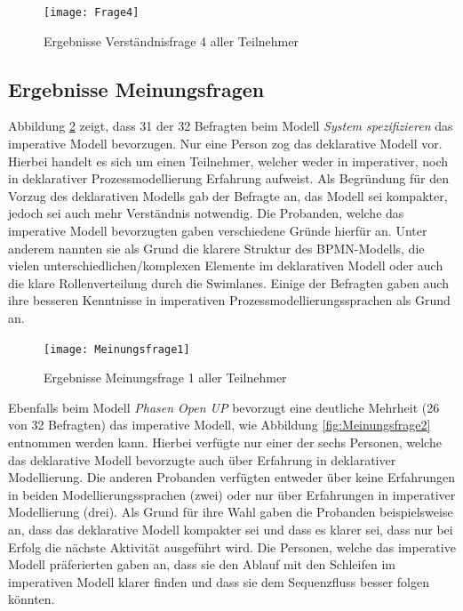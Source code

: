 \begin{figure}[htp]
\begin{center}
  \texttt{[image: Frage4]} %
  \caption{Ergebnisse Verständnisfrage 4 aller Teilnehmer}
  \label{fig:Frage4}
\end{center}
\end{figure}

\clearpage


\subsection{Ergebnisse Meinungsfragen}

Abbildung \ref{fig:Meinungsfrage1} zeigt, dass 31 der 32 Befragten beim Modell \textit{System spezifizieren} das imperative Modell bevorzugen. Nur eine Person zog das deklarative Modell vor. Hierbei handelt es sich um einen Teilnehmer, welcher weder in imperativer, noch in deklarativer Prozessmodellierung Erfahrung aufweist. Als Begründung für den Vorzug des deklarativen Modells gab der Befragte an, das Modell sei kompakter, jedoch sei auch mehr Verständnis notwendig.\newline
Die Probanden, welche das imperative Modell bevorzugten gaben verschiedene Gründe hierfür an. Unter anderem nannten sie als Grund die klarere Struktur des BPMN-Modells, die vielen unterschiedlichen/komplexen Elemente im deklarativen Modell oder auch die klare Rollenverteilung durch die Swimlanes. Einige der Befragten gaben auch ihre besseren Kenntnisse in imperativen Prozessmodellierungssprachen als Grund an.\newline

\begin{figure}[htp]
\begin{center}
  \texttt{[image: Meinungsfrage1]} %
  \caption{Ergebnisse Meinungsfrage 1 aller Teilnehmer}
  \label{fig:Meinungsfrage1}
\end{center}
\end{figure}

Ebenfalls beim Modell \textit{Phasen Open UP} bevorzugt eine deutliche Mehrheit (26 von 32 Befragten) das imperative Modell, wie Abbildung \ref{fig:Meinungsfrage2} entnommen werden kann. \newline
Hierbei verfügte nur einer der sechs Personen, welche das deklarative Modell bevorzugte auch über Erfahrung in deklarativer Modellierung. Die anderen Probanden verfügten entweder über keine Erfahrungen in beiden Modellierungssprachen (zwei) oder nur über Erfahrungen in imperativer Modellierung (drei). Als Grund für ihre Wahl gaben die Probanden beispielsweise an, dass das deklarative Modell kompakter sei und dass es klarer sei, dass nur bei Erfolg die nächste Aktivität ausgeführt wird.\newline
Die Personen, welche das imperative Modell präferierten gaben an, dass sie den Ablauf mit den Schleifen im imperativen Modell klarer finden und dass sie dem Sequenzfluss besser folgen könnten.\newline


